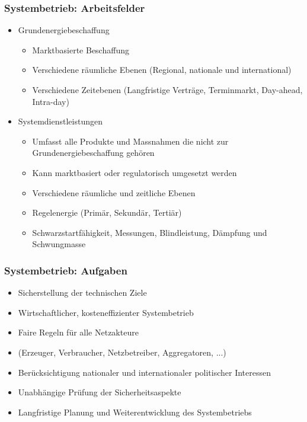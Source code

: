     \subsubsection{Systembetrieb: Arbeitsfelder}
        \begin{itemize}
            \item Grundenergiebeschaffung
            \begin{itemize}
                \item Marktbasierte Beschaffung
                \item Verschiedene räumliche Ebenen (Regional, nationale und international)
                \item Verschiedene Zeitebenen (Langfristige Verträge, Terminmarkt, Day-ahead, Intra-day)
            \end{itemize}
            \item Systemdienstleistungen
            \begin{itemize}
                \item Umfasst alle Produkte und Massnahmen die nicht zur Grundenergiebeschaffung gehören
                \item Kann marktbasiert oder regulatorisch umgesetzt werden
                \item Verschiedene räumliche und zeitliche Ebenen
                \item Regelenergie (Primär, Sekundär, Tertiär)
                \item Schwarzstartfähigkeit, Messungen, Blindleistung, Dämpfung und Schwungmasse
            \end{itemize}
        \end{itemize}

    \subsubsection{Systembetrieb: Aufgaben}
        \begin{itemize}
            \item Sicherstellung der technischen Ziele
            \item Wirtschaftlicher, kosteneffizienter Systembetrieb
            \item Faire Regeln für alle Netzakteure 
            \item[] (Erzeuger, Verbraucher, Netzbetreiber, Aggregatoren, ...)
            \item Berücksichtigung nationaler und internationaler politischer Interessen
            \item Unabhängige Prüfung der Sicherheitsaspekte
            \item Langfristige Planung und Weiterentwicklung des Systembetriebs
        \end{itemize}

